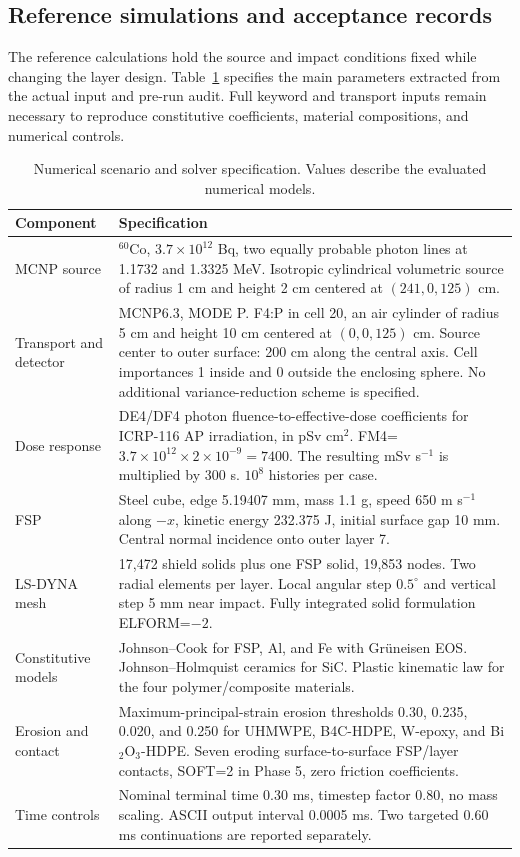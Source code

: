 \documentclass[12pt]{elsarticle}
\begin{document}
\subsection{Reference simulations and acceptance records}
The reference calculations hold the source and impact conditions fixed while changing the layer design. Table~\ref{tab:physical} specifies the main parameters extracted from the actual input and pre-run audit. Full keyword and transport inputs remain necessary to reproduce constitutive coefficients, material compositions, and numerical controls.
\begin{table}[H]\centering\small
\caption{Numerical scenario and solver specification. Values describe the evaluated numerical models.}\label{tab:physical}
\begin{tabular}{@{}p{.27\linewidth}p{.66\linewidth}@{}}\toprule
Component & Specification\\\midrule
MCNP source & $^{60}$Co, $3.7\times10^{12}$ Bq, two equally probable photon lines at 1.1732 and 1.3325 MeV. Isotropic cylindrical volumetric source of radius 1 cm and height 2 cm centered at $(241,0,125)$ cm.\\
Transport and detector & MCNP6.3, MODE P. F4:P in cell 20, an air cylinder of radius 5 cm and height 10 cm centered at $(0,0,125)$ cm. Source center to outer surface: 200 cm along the central axis. Cell importances 1 inside and 0 outside the enclosing sphere. No additional variance-reduction scheme is specified.\\
Dose response & DE4/DF4 photon fluence-to-effective-dose coefficients for ICRP-116 AP irradiation, in pSv cm$^2$. FM4=$3.7\times10^{12}\times2\times10^{-9}=7400$. The resulting mSv s$^{-1}$ is multiplied by 300 s. $10^8$ histories per case.\\
FSP & Steel cube, edge 5.19407 mm, mass 1.1 g, speed 650 m s$^{-1}$ along $-x$, kinetic energy 232.375 J, initial surface gap 10 mm. Central normal incidence onto outer layer 7.\\
LS-DYNA mesh & 17,472 shield solids plus one FSP solid, 19,853 nodes. Two radial elements per layer. Local angular step $0.5^{\circ}$ and vertical step 5 mm near impact. Fully integrated solid formulation ELFORM=$-2$.\\
Constitutive models & Johnson--Cook for FSP, Al, and Fe with Gr\"uneisen EOS. Johnson--Holmquist ceramics for SiC. Plastic kinematic law for the four polymer/composite materials.\\
Erosion and contact & Maximum-principal-strain erosion thresholds 0.30, 0.235, 0.020, and 0.250 for UHMWPE, B4C-HDPE, W-epoxy, and Bi$_2$O$_3$-HDPE. Seven eroding surface-to-surface FSP/layer contacts, SOFT=2 in Phase 5, zero friction coefficients.\\
Time controls & Nominal terminal time 0.30 ms, timestep factor 0.80, no mass scaling. ASCII output interval 0.0005 ms. Two targeted 0.60 ms continuations are reported separately.\\\bottomrule
\end{tabular}\end{table}
\end{document}
